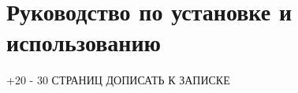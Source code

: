 \section{Руководство по установке и использованию}
\label{sec:manual}

+20 - 30 СТРАНИЦ ДОПИСАТЬ К ЗАПИСКЕ
